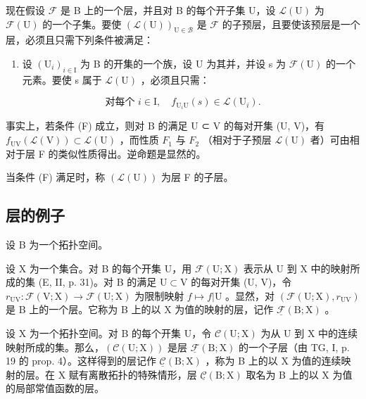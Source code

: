 现在假设 \(\mathcal{F}\) 是 B 上的一个层，并且对 B 的每个开子集 U，设 \(\mathcal{L}(\mathrm{U})\) 为 \(\mathcal{F}(\mathrm{U})\) 的一个子集。要使 \((\mathcal{L}(\mathrm{U}))_{\mathrm{U}\in \mathcal{B}}\) 是 \(\mathcal{F}\) 的子预层，且要使该预层是一个层，必须且只需下列条件被满足：

\begin{enumerate}
\def\labelenumi{(\Alph{enumi})}
\setcounter{enumi}{5}
\tightlist
\item
  设 \((\mathrm{U}_{i})_{i\in\mathrm{I}}\) 为 B 的开集的一个族，设 U 为其并，并设 s 为 \(\mathcal{F}(\mathrm{U})\) 的一个元素。要使 s 属于 \(\mathcal{L}(\mathrm{U})\) ，必须且只需：
\end{enumerate}

\[
\text{对每个 } i \in \mathrm{I},\quad f_{\mathrm{U}_{i}\mathrm{U}}(s)\in\mathcal{L}(\mathrm{U}_{i}).
\]

事实上，若条件 (F) 成立，则对 B 的满足 U ⊂ V 的每对开集 (U, V)，有 \(f_{\mathrm{UV}}(\mathcal{L}(\mathrm{V})) \subset \mathcal{L}(\mathrm{U})\) ，而性质 \(F_{1}\) 与 \(F_{2}\) （相对于子预层 \(\mathcal{L}(\mathrm{U})\) 者）可由相对于层 F 的类似性质得出。逆命题是显然的。

当条件 (F) 满足时，称 \((\mathcal{L}(\mathrm{U}))\) 为层 F 的子层。

\subsection{层的例子}

设 B 为一个拓扑空间。


设 X 为一个集合。对 B 的每个开集 U，用 \(\mathcal{F}(\mathrm{U};\mathrm{X})\) 表示从 U 到 X 中的映射所成的集 (E, II, p. 31)。对 B 的满足 \(\mathrm{U}\subset \mathrm{V}\) 的每对开集 (U, V)，令 \(r_{\mathrm{UV}}\colon \mathcal{F}(\mathrm{V};\mathrm{X})\to\mathcal{F}(\mathrm{U};\mathrm{X})\) 为限制映射 \(f\mapsto f|\mathrm{U}\) 。显然，对 \((\mathcal{F}(\mathrm{U};\mathrm{X}),r_{\mathrm{UV}})\) 是 B 上的一个层。它称为 B 上的以 X 为值的映射的层，记作 \(\underline{\mathcal{F}} (\mathrm{B};\mathrm{X})\) 。


设 X 为一个拓扑空间。对 B 的每个开集 U，令 \(\mathcal{C}(\mathrm{U};\mathrm{X})\) 为从 U 到 X 中的连续映射所成的集。那么，\((\mathcal{C}(\mathrm{U};\mathrm{X}))\) 是层 \(\underline{\mathcal{F}} (\mathrm{B};\mathrm{X})\) 的一个子层（由 TG, I, p. 19 的 prop. 4）。这样得到的层记作 \(\underline{\mathcal{C}} (\mathrm{B};\mathrm{X})\) ，称为 B 上的以 X 为值的连续映射的层。在 X 赋有离散拓扑的特殊情形，层 \(\underline{\mathcal{C}} (\mathrm{B};\mathrm{X})\) 取名为 B 上的以 X 为值的局部常值函数的层。

